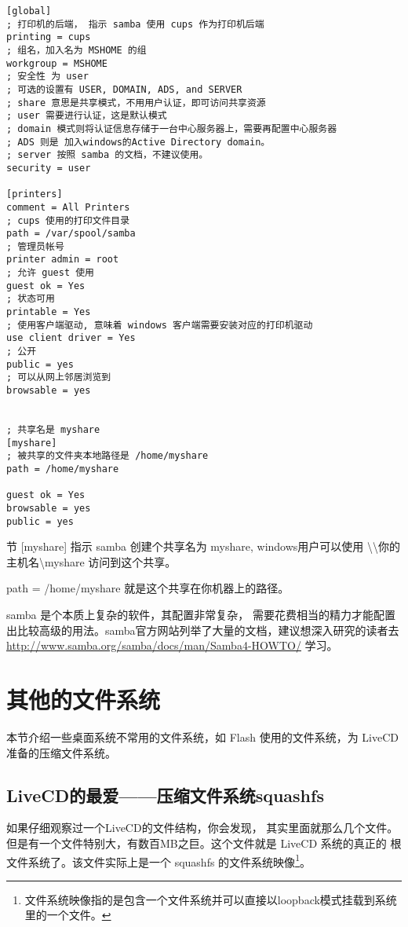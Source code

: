 \begin{verbatim}
[global]
; 打印机的后端， 指示 samba 使用 cups 作为打印机后端
printing = cups
; 组名，加入名为 MSHOME 的组
workgroup = MSHOME
; 安全性 为 user 
; 可选的设置有 USER, DOMAIN, ADS, and SERVER
; share 意思是共享模式，不用用户认证，即可访问共享资源
; user 需要进行认证，这是默认模式
; domain 模式则将认证信息存储于一台中心服务器上，需要再配置中心服务器
; ADS 则是 加入windows的Active Directory domain。
; server 按照 samba 的文档，不建议使用。
security = user

[printers]
comment = All Printers
; cups 使用的打印文件目录
path = /var/spool/samba
; 管理员帐号
printer admin = root
; 允许 guest 使用
guest ok = Yes
; 状态可用
printable = Yes
; 使用客户端驱动, 意味着 windows 客户端需要安装对应的打印机驱动
use client driver = Yes
; 公开
public = yes
; 可以从网上邻居浏览到
browsable = yes


; 共享名是 myshare
[myshare]
; 被共享的文件夹本地路径是 /home/myshare
path = /home/myshare

guest ok = Yes
browsable = yes
public = yes

\end{verbatim}

节 [myshare] 指示 samba 创建个共享名为 myshare, windows用户可以使用  \textbackslash{}\textbackslash{}你的主机名\textbackslash{}myshare 访问到这个共享。

path = /home/myshare 就是这个共享在你机器上的路径。

samba 是个本质上复杂的软件，其配置非常复杂， 需要花费相当的精力才能配置出比较高级的用法。samba官方网站列举了大量的文档，建议想深入研究的读者去
\url{http://www.samba.org/samba/docs/man/Samba4-HOWTO/} 学习。

\section{其他的文件系统}

本节介绍一些桌面系统不常用的文件系统，如 Flash 使用的文件系统，为 LiveCD 准备的压缩文件系统。

\subsection{LiveCD的最爱——压缩文件系统squashfs}

如果仔细观察过一个LiveCD的文件结构，你会发现， 其实里面就那么几个文件。但是有一个文件特别大，有数百MB之巨。这个文件就是 LiveCD 系统的真正的 根文件系统了。该文件实际上是一个 squashfs 的文件系统映像\footnote{文件系统映像指的是包含一个文件系统并可以直接以loopback模式挂载到系统里的一个文件。}。

